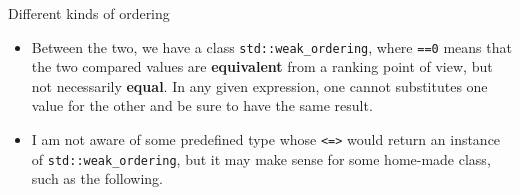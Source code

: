 \begin{frame}[fragile]
  \begin{block}{Different kinds of ordering}
    \begin{itemize}
      \item Between the two, we have a class \texttt{std::weak_ordering}, where \texttt{==0} means that the two compared values are \textbf{equivalent} from a ranking point of view, but not necessarily \textbf{equal}. In any given expression, one cannot substitutes one value for the other and be sure to have the same result.
      \item I am not aware of some predefined type whose \texttt{<=>} would return an instance of \texttt{std::weak_ordering}, but it may make sense for some home-made class, such as the following.
    \end{itemize}
  \end{block}
\end{frame}

